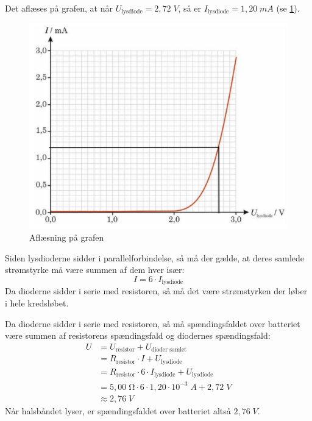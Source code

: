 \documentclass{report}
\begin{document}
Det aflæses på grafen, at når $U _{\text{lysdiode} }=2,72 \;\unit{V} $, så er $I_{\text{lysdiode} }=1,20 \;\unit{mA} $ (se \cref{fig:IU}).
\begin{figure}[H]
\begin{center}
  \includegraphics[scale=0.35]{IU.png}
\end{center}
\caption{Aflæsning på grafen}
\label{fig:IU}
\end{figure}

Siden lysdioderne sidder i parallelforbindelse, så må der gælde, at deres samlede strømstyrke må være summen af dem hver især:
\[
I=6 \cdot I_{\text{lysdiode} }
\] 
Da dioderne sidder i serie med resistoren, så må det være strømstyrken der løber i hele kredsløbet.

Da dioderne sidder i serie med resistoren, så må spændingsfaldet over batteriet være summen af resistorens spændingsfald og diodernes spændingsfald:
\begin{equation*}
\begin{split}
  U&=U_{\text{resistor} }+U_{\text{dioder samlet} }\\
  &=R_{\text{resistor} } \cdot I + U_{\text{lysdiode} }\\
  &=R_{\text{resistor} } \cdot 6 \cdot I_{\text{lysdiode} } + U_{\text{lysdiode} }\\
  &=5,00 \;\unit{\ohm} \cdot 6 \cdot 1,20 \cdot 10 ^{-3} \;\unit{A} + 2,72 \;\unit{V} \\
  &\approx 2,76 \;\unit{V}  
\end{split}
\end{equation*}
Når halsbåndet lyser, er spændingsfaldet over batteriet altså $2,76 \;\unit{V} $.
\end{document}
